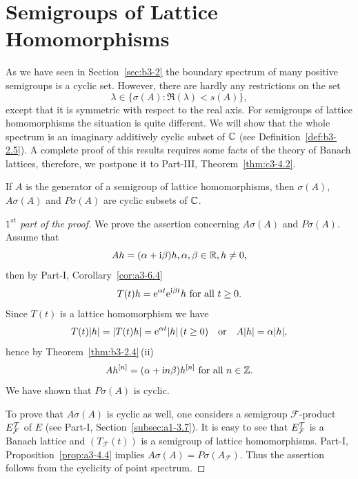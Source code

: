 \section{Semigroups of Lattice Homomorphisms}\label{sec:b3-4}%
As we have seen in Section~\ref{sec:b3-2} the boundary spectrum of many positive semigroups is a cyclic set.
However, there are hardly any restrictions on the set 
\[
\lambda \in \{ \sigma(A) \colon \Re(\lambda) < s(A)\} , 
\] 
except that it is symmetric with respect to the real axis.
For semigroups of lattice homomorphisms the situation is quite different.
We will show that the whole spectrum is an imaginary additively cyclic 
subset of\/ $\mathbb{C}$ (see Definition~\ref{def:b3-2.5}).
A complete proof of this results requires some facts of the theory of Banach lattices, therefore, we postpone it to Part-III, Theorem~\ref{thm:c3-4.2}.
\begin{theorem}\label{thm:b3-4.1}
If\/ $A$ is the generator of a semigroup of lattice homomorphisms, then $\sigma(A)$, $A\sigma(A)$ and $P\sigma(A)$ are cyclic subsets of\/ $\mathbb{C}$.
\end{theorem}
\begin{proof}[$1^{st}$ part of the proof]
We prove the assertion concerning $A\sigma(A)$ and $P\sigma(A)$.
	Assume that 
    \[
    Ah = (\alpha + \mathrm{i}\beta)h ,  \alpha,\beta \in \mathbb{R} ,  h \neq 0 , 
    \]
    then by Part-I, Corollary~\ref{cor:a3-6.4}
    \[
    T(t)h = \eu^{\alpha t}\eu^{\im\beta  t}h \text{ for all } t \geq 0 .
    \]
	Since $T(t)$ is a lattice homomorphism we have 
    \[
    T(t)|h| = |T(t)h| = \eu^{\alpha t}|h|\, (t \geq 0)
    \quad\text{or}\quad A|h| = \alpha|h| , 
    \] 
    hence by Theorem~\ref{thm:b3-2.4}\,(ii)
    \[
    Ah^{[n]} = (\alpha + \mathrm{i} n\beta)h^{[n]} \text{ for all } n \in \mathbb{Z} .
    \]
	We have shown that $P\sigma(A)$ is cyclic.
	
	To prove that $A\sigma(A)$ is cyclic as well, one considers a semigroup $\mathcal{F}$-product $E_{\mathcal{F}}^{\mathcal{T}}$ of\/ $E$ 
	(see Part-I, Section~\ref{subsec:a1-3.7}).
	It is easy to see that $E_{\mathcal{F}}^{\mathcal{T}}$ is a Banach lattice 
	and $(T_{\mathcal{F}}(t))$ is a semigroup of lattice homomorphisms.
	Part-I, Proposition~\ref{prop:a3-4.4} implies $A\sigma(A) = P\sigma(A_{\mathcal{F}})$.
	Thus the assertion follows from the cyclicity of point spectrum.
\end{proof}
